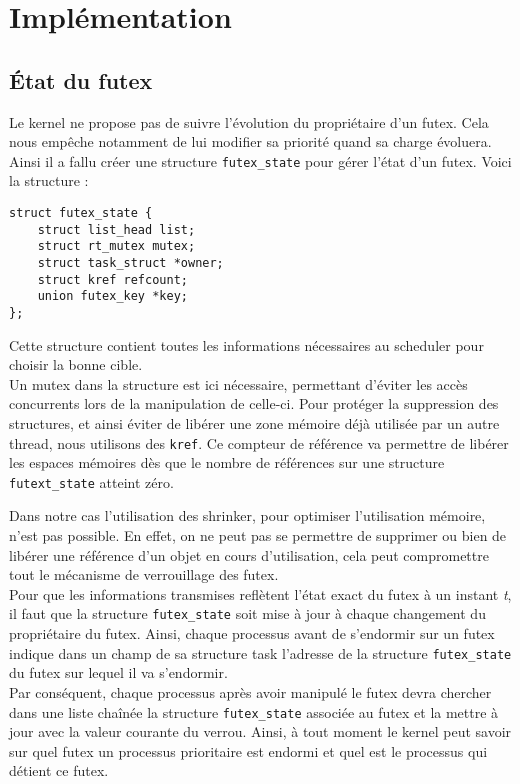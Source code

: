 \section{Implémentation}

\subsection{État du futex}

Le kernel ne propose pas de suivre l'évolution du propriétaire d'un futex.
Cela nous empêche notamment de lui modifier sa priorité quand sa charge évoluera.
Ainsi il a fallu créer une structure \verb|futex_state| pour gérer l'état d'un futex. 
Voici la structure :
\begin{lstlisting}
struct futex_state {
	struct list_head list;
	struct rt_mutex mutex;
	struct task_struct *owner;
	struct kref refcount;
	union futex_key *key;
};
\end{lstlisting}

Cette structure contient toutes les informations nécessaires au scheduler pour 
choisir la bonne cible.
\\

Un mutex dans la structure est ici nécessaire, permettant d'éviter les accès concurrents lors de la manipulation de celle-ci. Pour protéger la suppression des structures, et ainsi éviter de libérer une zone mémoire déjà utilisée par un autre thread, nous utilisons des \verb|kref|. Ce compteur de référence va permettre de libérer les espaces mémoires dès que le nombre de références sur une structure \verb|futext_state| atteint zéro.

Dans notre cas l'utilisation des shrinker, pour optimiser l'utilisation
mémoire, n'est pas possible. En effet, on ne peut pas se permettre de supprimer ou bien de libérer une référence d'un objet en cours d'utilisation, cela peut compromettre tout le mécanisme de verrouillage des futex.
\\

Pour que les informations transmises reflètent l'état exact du futex
à un instant \textit{t}, il faut que la structure \verb|futex_state| soit mise à jour
à chaque changement du propriétaire du futex. Ainsi, chaque processus avant de 
s'endormir sur un futex indique dans un champ de sa structure task l'adresse de 
la structure \verb|futex_state| du futex sur lequel il va s'endormir.
\\

Par conséquent, chaque processus après avoir manipulé le futex 
devra chercher dans une liste chaînée la structure \verb|futex_state| associée au 
futex et la mettre à jour avec la valeur courante du verrou. Ainsi, à tout moment 
le kernel peut savoir sur quel futex un processus prioritaire est endormi et quel
est le processus qui détient ce futex.